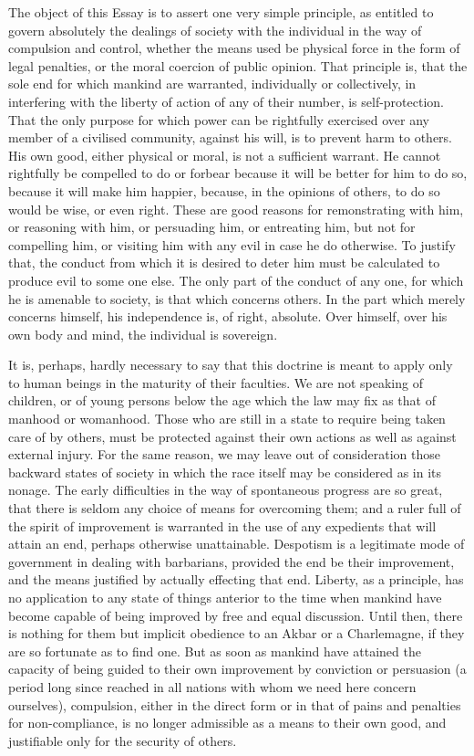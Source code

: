 \documentclass[11pt,openany]{book}
\begin{document}
The object of this Essay is to assert one very simple principle, as entitled to govern absolutely the dealings of society with the individual in the way of compulsion and control, whether the means used be physical force in the form of legal penalties, or the moral coercion of public opinion. That principle is, that the sole end for which mankind are warranted, individually or collectively, in interfering with the liberty of action of any of their number, is self-protection. That the only purpose for which power can be rightfully exercised over any member of a civilised community, against his will, is to prevent harm to others. His own good, either physical or moral, is not a sufficient warrant. He cannot rightfully be compelled to do or forbear because it will be better for him to do so, because it will make him happier, because, in the opinions of others, to do so would be wise, or even right. These are good reasons for remonstrating with him, or reasoning with him, or persuading him, or entreating him, but not for compelling him, or visiting him with any evil in case he do otherwise. To justify that, the conduct from which it is desired to deter him must be calculated to produce evil to some one else. The only part of the conduct of any one, for which he is amenable to society, is that which concerns others. In the part which merely concerns himself, his independence is, of right, absolute. Over himself, over his own body and mind, the individual is sovereign.

It is, perhaps, hardly necessary to say that this doctrine is meant to apply only to human beings in the maturity of their faculties. We are not speaking of children, or of young persons below the age which the law may fix as that of manhood or womanhood. Those who are still in a state to require being taken care of by others, must be protected against their own actions as well as against external injury. For the same reason, we may leave out of consideration those backward states of society in which the race itself may be considered as in its nonage. The early difficulties in the way of spontaneous progress are so great, that there is seldom any choice of means for overcoming them; and a ruler full of the spirit of improvement is warranted in the use of any expedients that will attain an end, perhaps otherwise unattainable. Despotism is a legitimate mode of government in dealing with barbarians, provided the end be their improvement, and the means justified by actually effecting that end. Liberty, as a principle, has no application to any state of things anterior to the time when mankind have become capable of being improved by free and equal discussion. Until then, there is nothing for them but implicit obedience to an Akbar or a Charlemagne, if they are so fortunate as to find one. But as soon as mankind have attained the capacity of being guided to their own improvement by conviction or persuasion (a period long since reached in all nations with whom we need here concern ourselves), compulsion, either in the direct form or in that of pains and penalties for non-compliance, is no longer admissible as a means to their own good, and justifiable only for the security of others.
\end{document}

